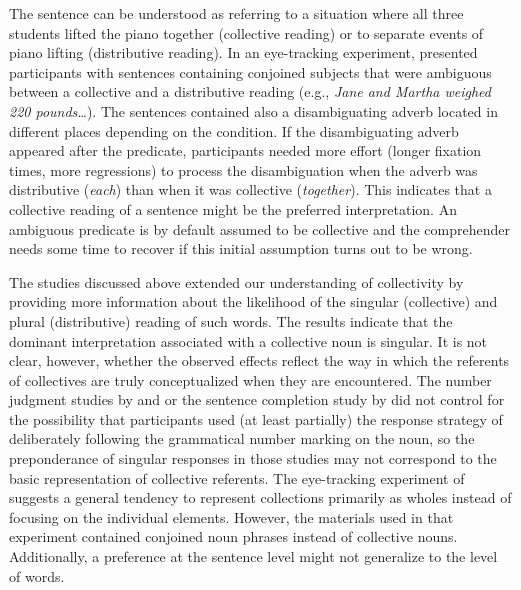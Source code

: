 \documentclass[output=paper]{langscibook}
\begin{document}
\noindent The sentence can be understood as referring to a situation where all three students lifted the piano together (collective reading) or to separate events of piano lifting (distributive reading). In an eye-tracking experiment, \citet{aFrazierTakingsemanticcommitments1999} presented participants with sentences containing conjoined subjects that were ambiguous between a collective and a distributive reading (e.g., \textit{Jane and Martha weighed 220 pounds\dots}). The sentences contained also a disambiguating adverb located in different places depending on the condition. If the disambiguating adverb appeared after the predicate, participants needed more effort (longer fixation times, more regressions) to process the disambiguation when the adverb was distributive (\textit{each}) than when it was collective (\textit{together}). This indicates that a collective reading of a sentence might be the preferred interpretation. An ambiguous predicate is by default assumed to be collective and the comprehender needs some time to recover if this initial assumption turns out to be wrong. 

The studies discussed above extended our understanding of collectivity by providing more information about the likelihood of the singular (collective) and plural (distributive) reading of such words. The results indicate that the dominant interpretation associated with a collective noun is singular. It is not clear, however, whether the observed effects reflect the way in which the referents of collectives are truly conceptualized when they are encountered. The number judgment studies by \citet{bockMeaningSoundSyntax1993} and \citet{nenonenMismatchesGrammaticalNumber2010} or the sentence completion study by \citet{bockNumberAgreementBritish2006} did not control for the possibility that participants used (at least partially) the response strategy of deliberately following the grammatical number marking on the noun, so the preponderance of singular responses in those studies may not correspond to the basic representation of collective referents. The eye-tracking experiment of \citet{aFrazierTakingsemanticcommitments1999} suggests a general tendency to represent collections primarily as wholes instead of focusing on the individual elements. However, the materials used in that experiment contained conjoined noun phrases instead of collective nouns. Additionally, a preference at the sentence level might not generalize to the level of words. 
\end{document}
